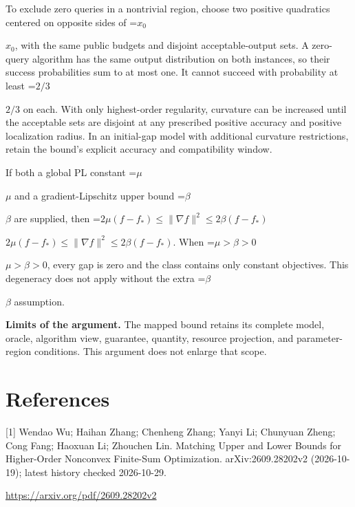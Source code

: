 \documentclass[10pt,a4paper]{article}
\newcommand{\AtlasMath}[1]{\par\begingroup\centering\setbox0=\hbox{$\displaystyle #1$}\ifdim\wd0>1.4\linewidth\typeout{ATLAS WIDE FORMULA: \the\wd0}\fi\ifdim\wd0>\linewidth\resizebox{\linewidth}{!}{\box0}\else\box0\fi\par\endgroup}
\newcommand{\AtlasInlineMath}[1]{\begingroup\setbox0=\hbox{$#1$}\ifdim\wd0>.4\linewidth\endgroup\AtlasMath{#1}\else\endgroup$#1$\fi}
\begin{document}
To exclude zero queries in a nontrivial region, choose two positive quadratics centered on opposite sides of \AtlasInlineMath{x_0}, with the same public budgets and disjoint acceptable-output sets. A zero-query algorithm has the same output distribution on both instances, so their success probabilities sum to at most one. It cannot succeed with probability at least \AtlasInlineMath{2/3} on each. With only highest-order regularity, curvature can be increased until the acceptable sets are disjoint at any prescribed positive accuracy and positive localization radius. In an initial-gap model with additional curvature restrictions, retain the bound's explicit accuracy and compatibility window.

If both a global PL constant \AtlasInlineMath{\mu} and a gradient-Lipschitz upper bound \AtlasInlineMath{\beta} are supplied, then \AtlasInlineMath{2\mu(f-f_*)\le\|\nabla f\|^2\le2\beta(f-f_*)}. When \AtlasInlineMath{\mu>\beta>0}, every gap is zero and the class contains only constant objectives. This degeneracy does not apply without the extra \AtlasInlineMath{\beta} assumption.

\textbf{Limits of the argument.} The mapped bound retains its complete model, oracle, algorithm view, guarantee, quantity, resource projection, and parameter-region conditions. This argument does not enlarge that scope.

\section{References}
[1] Wendao Wu; Haihan Zhang; Chenheng Zhang; Yanyi Li; Chunyuan Zheng; Cong Fang; Haoxuan Li; Zhouchen Lin. Matching Upper and Lower Bounds for Higher-Order Nonconvex Finite-Sum Optimization. arXiv:2609.28202v2 (2026-10-19); latest history checked 2026-10-29.

\url{https://arxiv.org/pdf/2609.28202v2}
\end{document}
